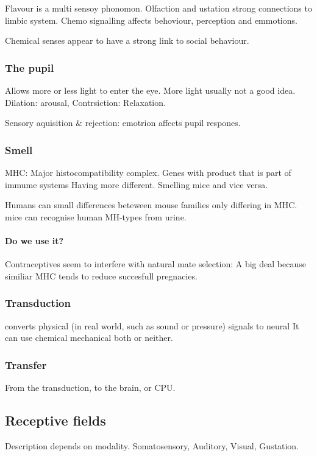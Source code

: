 \documentclass{article}
\begin{document}
Flavour is a multi sensoy phonomon. Olfaction and ustation strong connections
to limbic system. Chemo signalling affects behoviour, perception and emmotions.

Chemical senses appear to have a strong link to social behaviour.

\subsubsection{The pupil}
Allows more or less light to enter the eye. More light usually not a good idea.
Dilation: arousal, Contrsiction: Relaxation.

Sensory aquisition \& rejection: emotrion affects pupil respones.

\subsubsection{Smell}

MHC: Major histocompatibility complex. Genes with product that is part of
immume systems Having more different. Smelling mice and vice versa.

Humans can small differences beteween mouse families only differing in MHC.
mice can recognise human MH-types from urine.


\paragraph{Do we use it?} Contraceptives seem to interfere with natural mate
selection: A big deal because similiar MHC tends to reduce succesfull
pregnacies.
\subsubsection{Transduction}
converts physical (in real world, such as sound or pressure) signals to neural
It can use chemical mechanical both or neither.

\subsubsection{Transfer}
From the transduction, to the brain, or CPU.

\subsection{Receptive fields}
Description depends on modality. Somatosensory, Auditory, Visual, Gustation.
\end{document}
